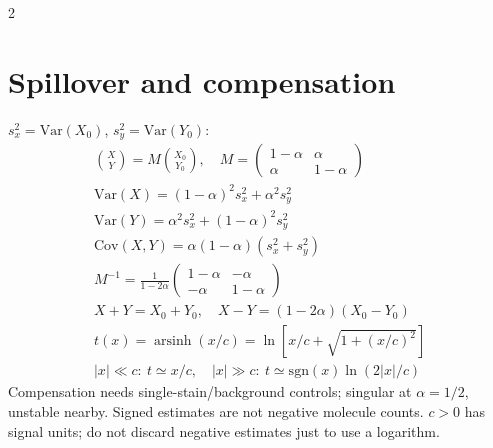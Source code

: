 \documentclass[10pt,a4paper]{scrartcl}
\begin{document}
\begin{multicols}{2}
\section*{Spillover and compensation}
$s_x^2=\mathrm{Var}(X_0)$, $s_y^2=\mathrm{Var}(Y_0)$:
\begin{gather*}
\binom XY=M\binom{X_0}{Y_0},\quad
M=\begin{pmatrix}1-\alpha&\alpha\\\alpha&1-\alpha\end{pmatrix}\\
\mathrm{Var}(X)=(1-\alpha)^2s_x^2+\alpha^2s_y^2\\
\mathrm{Var}(Y)=\alpha^2s_x^2+(1-\alpha)^2s_y^2\\
\mathrm{Cov}(X,Y)=\alpha(1-\alpha)(s_x^2+s_y^2)\\
M^{-1}=\frac1{1-2\alpha}\begin{pmatrix}1-\alpha&-\alpha\\-\alpha&1-\alpha\end{pmatrix}\\
X+Y=X_0+Y_0,\quad X-Y=(1-2\alpha)(X_0-Y_0)\\
t(x)=\operatorname{arsinh}(x/c)=\ln[x/c+\sqrt{1+(x/c)^2}]\\
|x|\ll c:\ t\simeq x/c,\quad |x|\gg c:\ t\simeq\mathrm{sgn}(x)\ln(2|x|/c)
\end{gather*}
Compensation needs single-stain/background controls; singular at $\alpha=1/2$, unstable nearby. Signed estimates are not negative molecule counts. $c>0$ has signal units; do not discard negative estimates just to use a logarithm.


\end{multicols}
\end{document}
